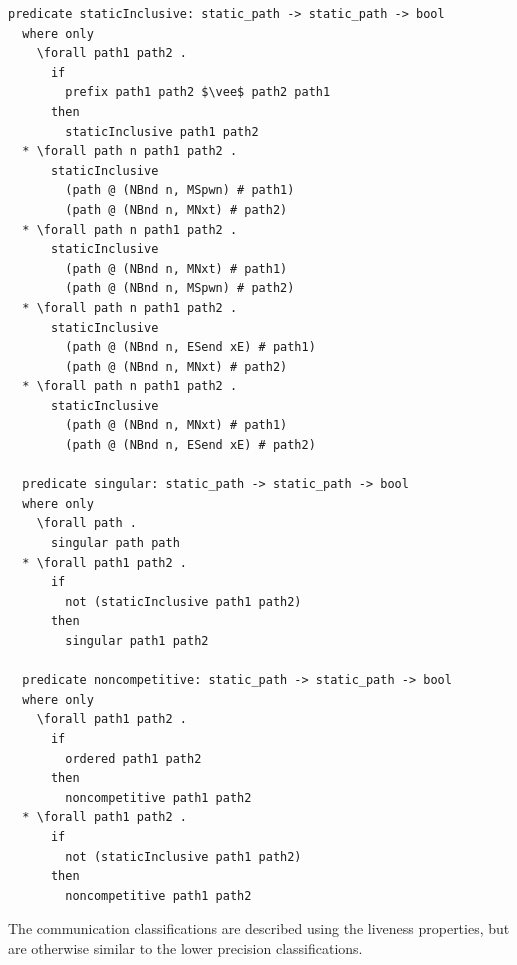 \documentclass[letterpaper, 11pt]{extarticle}
\begin{document}
\begin{lstlisting}[language=logic, mathescape]
  predicate staticInclusive: static_path -> static_path -> bool
  where only
    \forall path1 path2 .
      if
        prefix path1 path2 $\vee$ path2 path1
      then
        staticInclusive path1 path2
  * \forall path n path1 path2 .
      staticInclusive
        (path @ (NBnd n, MSpwn) # path1)
        (path @ (NBnd n, MNxt) # path2)
  * \forall path n path1 path2 .
      staticInclusive
        (path @ (NBnd n, MNxt) # path1)
        (path @ (NBnd n, MSpwn) # path2)
  * \forall path n path1 path2 .
      staticInclusive
        (path @ (NBnd n, ESend xE) # path1)
        (path @ (NBnd n, MNxt) # path2)
  * \forall path n path1 path2 .
      staticInclusive
        (path @ (NBnd n, MNxt) # path1)
        (path @ (NBnd n, ESend xE) # path2)

  predicate singular: static_path -> static_path -> bool
  where only
    \forall path .
      singular path path
  * \forall path1 path2 .
      if
        not (staticInclusive path1 path2)
      then
        singular path1 path2

  predicate noncompetitive: static_path -> static_path -> bool
  where only
    \forall path1 path2 . 
      if
        ordered path1 path2
      then
        noncompetitive path1 path2
  * \forall path1 path2 .
      if
        not (staticInclusive path1 path2)
      then
        noncompetitive path1 path2
  \end{lstlisting}

The communication classifications are described using the liveness properties, but
are otherwise similar to the lower precision classifications.
\end{document}
